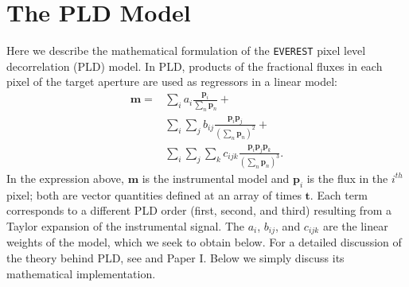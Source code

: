\documentclass[]{emulateapj}
\begin{document}
\section{The PLD Model}
\label{sec:model}
Here we describe the mathematical formulation of the \texttt{EVEREST}
pixel level decorrelation (PLD) model. In PLD, products of the fractional fluxes in each pixel
of the target aperture are used as regressors in a linear model:
%
\begin{align}
\label{eq:pldmodel}
\mathbf{m} = &\sum\limits_{i}                                 a_i     \frac{\mathbf{p}_{i}}                             { \sum\limits_{n}\mathbf{p}_{n}} +     \nonumber\\
             &\sum\limits_{i} \sum\limits_{j}                 b_{ij}  \frac{\mathbf{p}_{i}\mathbf{p}_{j}}               {(\sum\limits_{n}\mathbf{p}_{n})^2} +  \nonumber\\
             &\sum\limits_{i} \sum\limits_{j} \sum\limits_{k} c_{ijk} \frac{\mathbf{p}_{i}\mathbf{p}_{j}\mathbf{p}_{k}} {(\sum\limits_{n}\mathbf{p}_{n})^3}.
\end{align}
%
In the expression above, $\mathbf{m}$ is the instrumental model and $\mathbf{p}_{i}$ is the flux in
the $i^{th}$ pixel; both are vector quantities defined at an array of times $\mathbf{t}$.
Each term corresponds to a different PLD order (first, second, and third) resulting from 
a Taylor expansion of the instrumental signal.
The $a_i$, $b_{ij}$, and $c_{ijk}$ are the linear weights of the model, which we seek
to obtain below. For a detailed discussion of the theory behind PLD, see 
\cite{Deming15} and Paper I. Below we simply discuss its mathematical implementation.
\end{document}
